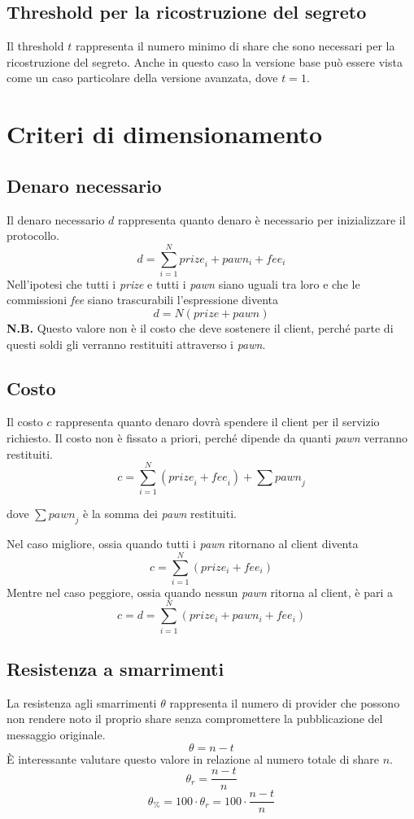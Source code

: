 \subsection{Threshold per la ricostruzione del segreto}
Il threshold $ t $ rappresenta il numero minimo di share che
sono necessari per la ricostruzione del segreto.
Anche in questo caso la versione base può essere vista come un caso particolare
della versione avanzata, dove $ t = 1 $.

\section{Criteri di dimensionamento}

\subsection{Denaro necessario}
Il denaro necessario $ d $ rappresenta quanto denaro è necessario per inizializzare
il protocollo.
$$ d = \sum_{i=1}^{N} \textit{prize}_i + pawn_i + fee_i $$
Nell'ipotesi che tutti i \textit{prize} e tutti i \textit{pawn}
siano uguali tra loro e che le commissioni \textit{fee} siano trascurabili
l'espressione diventa
$$ d = N(prize + pawn) $$
\textbf{N.B.} Questo valore non è il costo che deve sostenere il client, perché parte
di questi soldi gli verranno restituiti attraverso i \textit{pawn}.

\subsection{Costo}
Il costo $ c $ rappresenta quanto denaro dovrà spendere il client per il servizio
richiesto. Il costo non è fissato a priori,
perché dipende da quanti \textit{pawn} verranno
restituiti.
$$ c = \sum_{i=1}^{N} (\textit{prize}_i + \textit{fee}_i) + \sum \textit{pawn}_j $$
\begin{flushright}
	dove $ \sum \textit{pawn}_j $ è la somma dei \textit{pawn} restituiti.
\end{flushright}
Nel caso migliore, ossia quando tutti i \textit{pawn} ritornano al client diventa
$$ c = \sum_{i=1}^{N} (prize_i + fee_i) $$
Mentre nel caso peggiore, ossia quando nessun \textit{pawn}
ritorna al client, è pari a
$$ c = d = \sum_{i=1}^{N} (prize_i + pawn_i + fee_i) $$


\subsection{Resistenza a smarrimenti}
La resistenza agli smarrimenti $ \theta $ rappresenta
il numero di provider che possono non
rendere noto il proprio share senza compromettere la pubblicazione del messaggio
originale.
$$ \theta = n - t $$
È interessante valutare questo valore in relazione
al numero totale di share $ n $.
$$ \theta_r = \frac{n - t}{n} $$
$$ \theta_\% = 100 \cdot \theta_r = 100 \cdot \frac{n - t}{n} $$

